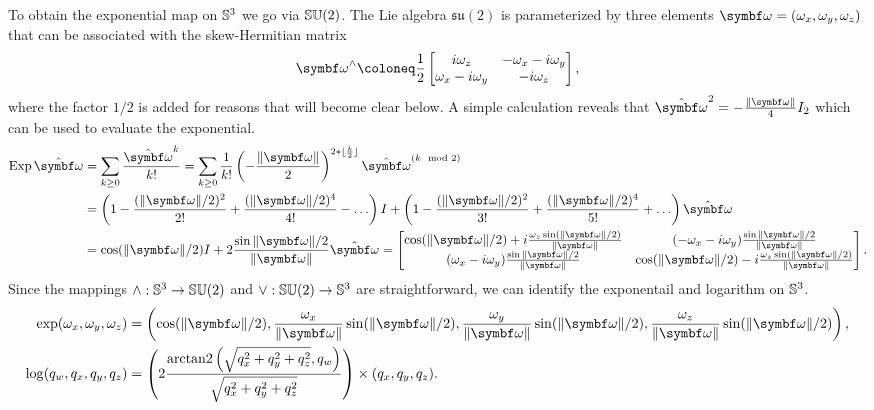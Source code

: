 To obtain the exponential map on ${\mathbb{S}^3}$ we go via ${\mathbb{SU}(2)}$. The Lie algebra $\mathfrak{su}(2)$ is parameterized by three elements $\bomega = (\omega_x, \omega_y, \omega_z)$ that can be associated with the skew-Hermitian matrix
\begin{equation}
  \bomega^\wedge \coloneq \frac{1}{{2}} \begin{bmatrix}
    i \omega_z            & -\omega_x - i \omega_y \\
    \omega_x - i \omega_y & -i \omega_z
  \end{bmatrix},
\end{equation}
where the factor $1/2$ is added for reasons that will become clear below. A simple calculation reveals that $\hat \bomega^2 =  -\frac{\| \bomega \|}{4} I_2$ which can be used to evaluate the exponential.
\begin{equation*}
  \begin{aligned}
    \Exp \hat \bomega
     & = \sum_{k \geq 0} \frac{\hat \bomega^k}{k!} = \sum_{k \geq 0} \frac{1}{k!} \left(-\frac{\| \bomega \|}{2} \right)^{2 * \lfloor \frac{k}{2} \rfloor} \hat \bomega^{(k \mod 2)}                      \\
     & = \left( 1 - \frac{(\|\bomega\|/2)^2}{2!} + \frac{(\|\bomega\|/2)^4}{4!} - \ldots \right) I + \left( 1 - \frac{(\|\bomega\|/2)^2}{3!} + \frac{(\|\bomega\|/2)^4}{5!} + \ldots \right) \hat \bomega \\
     & = \cos (\|\bomega\| / 2) I + 2 \frac{\sin \|\bomega\| / 2}{\|\bomega\|} \hat \bomega = \begin{bmatrix}
      \cos(\|\bomega\| / 2) + i \frac{\omega_z \sin (\|\bomega\|/2) }{\|\bomega\|} & (-\omega_x - i \omega_y) \frac{\sin \|\bomega\|/2}{\|\bomega\|}              \\
      (\omega_x - i \omega_y) \frac{\sin \|\bomega\|/2}{\|\bomega\|}               & \cos(\|\bomega\| / 2) - i \frac{\omega_z \sin (\|\bomega\|/2) }{\|\bomega\|}
    \end{bmatrix}.
  \end{aligned}
\end{equation*}
Since the mappings $\wedge: {\mathbb{S}^3} \rightarrow {\mathbb{SU}(2)}$ and $\vee: {\mathbb{SU}(2)} \rightarrow {\mathbb{S}^3}$ are straightforward, we can identify the exponentail and logarithm on ${\mathbb{S}^3}$.
\begin{subequations}
  \label{eq:su2_exp_log}
  \begin{align}
    \label{eq:su2_exp}\exp (\omega_x, \omega_y, \omega_z) & = \left(
    \cos (\| \bomega \|/2), \frac{\omega_x}{\| \bomega \|} \sin (\| \bomega \|/2), \frac{\omega_y}{\| \bomega \|} \sin (\| \bomega \|/2), \frac{\omega_z}{\| \bomega \|} \sin ( \| \bomega \|/2 ) \right), \\
    \label{eq:su2_log} \log (q_w, q_x, q_y, q_z)          & = \left( 2 \frac{ \arctantwo \left(\sqrt{q_x^2 + q_y^2 + q_z^2}, q_w \right) }{ \sqrt{q_x^2 + q_y^2 + q_z^2} } \right) \times (q_x, q_y, q_z).
  \end{align}
\end{subequations}
